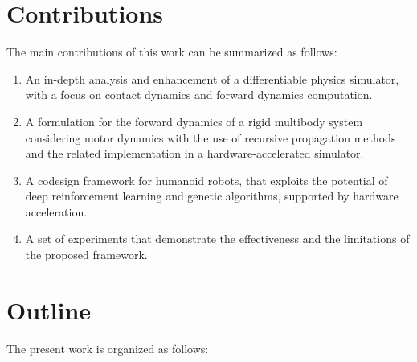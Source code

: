 \section*{Contributions}

The main contributions of this work can be summarized as follows:

\begin{enumerate}
    \item An in-depth analysis and enhancement of a differentiable physics simulator, with a focus on contact dynamics and forward dynamics computation.
    \item A formulation for the forward dynamics of a rigid multibody system considering motor dynamics with the use of recursive propagation methods and the related implementation in a hardware-accelerated simulator.
    \item A codesign framework for humanoid robots, that exploits the potential of deep reinforcement learning and genetic algorithms, supported by hardware acceleration.
    \item A set of experiments that demonstrate the effectiveness and the limitations of the proposed framework.
\end{enumerate}


\section*{Outline}

The present work is organized as follows:


